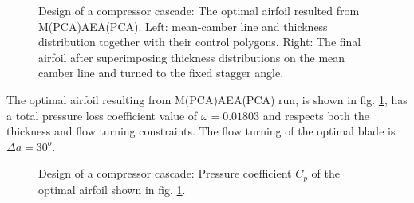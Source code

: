 \begin{figure}[h!]
\begin{minipage}[b]{1\linewidth}
 \centering
\end{minipage}
\caption{Design of a compressor cascade: The optimal airfoil resulted from M(PCA)AEA(PCA). Left: mean-camber line and thickness distribution together with their control polygons. Right: The final airfoil after superimposing thickness distributions on the mean camber line and turned to the fixed stagger angle.} 
\label{PCADrelaRes}
\end{figure}

The optimal airfoil resulting from M(PCA)AEA(PCA) run, is shown in fig. \ref{PCADrelaRes}, has a total pressure loss coefficient value of $\omega=0.01803$ and respects both the thickness and flow turning constraints.  The flow turning of the optimal blade is $\Delta a=30^o$.

\begin{figure}[h!]
\begin{minipage}[b]{1\linewidth}
 \centering
\end{minipage}
\caption{Design of a compressor cascade: Pressure coefficient $C_p$ of the optimal airfoil shown in fig. \ref{PCADrelaRes}.} 
\label{PCADrelaRes_cp}
\end{figure}

